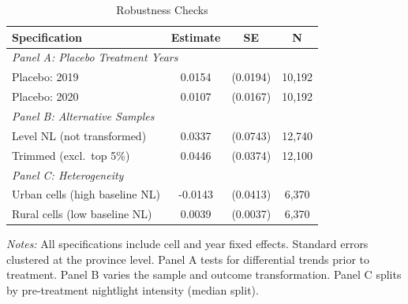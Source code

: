 \begin{table}[H]
\centering
\caption{Robustness Checks}
\begin{threeparttable}
\begin{tabular}{lccc}
\toprule
Specification & Estimate & SE & N \\
\midrule
\multicolumn{4}{l}{\textit{Panel A: Placebo Treatment Years}} \\
Placebo: 2019 & 0.0154 & (0.0194) & 10,192 \\
Placebo: 2020 & 0.0107 & (0.0167) & 10,192 \\
\midrule
\multicolumn{4}{l}{\textit{Panel B: Alternative Samples}} \\
Level NL (not transformed) & 0.0337 & (0.0743) & 12,740 \\
Trimmed (excl.\ top 5\%) & 0.0446 & (0.0374) & 12,100 \\
\midrule
\multicolumn{4}{l}{\textit{Panel C: Heterogeneity}} \\
Urban cells (high baseline NL) & -0.0143 & (0.0413) & 6,370 \\
Rural cells (low baseline NL) & 0.0039 & (0.0037) & 6,370 \\
\bottomrule
\end{tabular}
\begin{tablenotes}[flushleft]
\small
\item \textit{Notes:} All specifications include cell and year fixed effects. Standard errors clustered at the province level. Panel A tests for differential trends prior to treatment. Panel B varies the sample and outcome transformation. Panel C splits by pre-treatment nightlight intensity (median split).
\end{tablenotes}
\end{threeparttable}
\label{tab:robustness}
\end{table}

